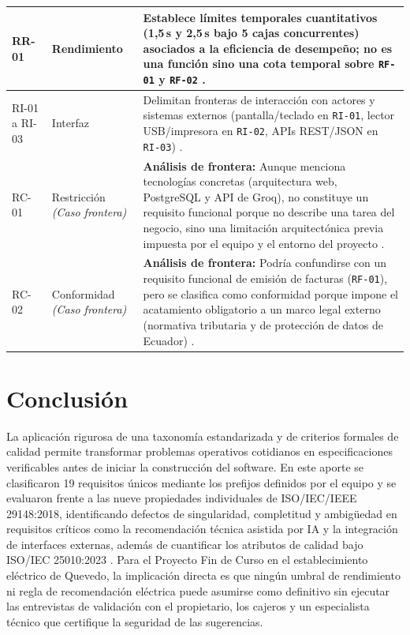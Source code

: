 \documentclass[onecolumn,12pt]{IEEEtran}
\begin{document}
\begin{longtable}{>{\raggedright\arraybackslash}p{1.4cm} >{\raggedright\arraybackslash}p{2.4cm} >{\raggedright\arraybackslash}p{11.2cm}}
		\midrule
		RR-01 & Rendimiento & Establece l\'imites temporales cuantitativos (1,5\,s y 2,5\,s bajo 5 cajas concurrentes) asociados a la eficiencia de desempe\~no; no es una funci\'on sino una cota temporal sobre \texttt{RF-01} y \texttt{RF-02} \cite{iso29148,iso25010}. \\
		\midrule
		RI-01 a RI-03 & Interfaz & Delimitan fronteras de interacci\'on con actores y sistemas externos (pantalla/teclado en \texttt{RI-01}, lector USB/impresora en \texttt{RI-02}, APIs REST/JSON en \texttt{RI-03}) \cite{iso29148}. \\
		\midrule
		RC-01 & Restricci\'on \textit{(Caso frontera)} & \textbf{An\'alisis de frontera:} Aunque menciona tecnolog\'ias concretas (arquitectura web, PostgreSQL y API de Groq), no constituye un requisito funcional porque no describe una tarea del negocio, sino una limitaci\'on arquitect\'onica previa impuesta por el equipo y el entorno del proyecto \cite{pohl2025,glinz2007}. \\
		\midrule
		RC-02 & Conformidad \textit{(Caso frontera)} & \textbf{An\'alisis de frontera:} Podr\'ia confundirse con un requisito funcional de emisi\'on de facturas (\texttt{RF-01}), pero se clasifica como conformidad porque impone el acatamiento obligatorio a un marco legal externo (normativa tributaria y de protecci\'on de datos de Ecuador) \cite{iso29148,swebok4}. \\
	\end{longtable}
	
	\section{Conclusi\'on}
	
	La aplicaci\'on rigurosa de una taxonom\'ia estandarizada y de criterios formales de calidad permite transformar problemas operativos cotidianos en especificaciones verificables antes de iniciar la construcci\'on del software. En este aporte se clasificaron 19 requisitos \'unicos mediante los prefijos definidos por el equipo y se evaluaron frente a las nueve propiedades individuales de ISO/IEC/IEEE 29148:2018, identificando defectos de singularidad, completitud y ambig\"uedad en requisitos cr\'iticos como la recomendaci\'on t\'ecnica asistida por IA y la integraci\'on de interfaces externas, adem\'as de cuantificar los atributos de calidad bajo ISO/IEC 25010:2023 \cite{iso29148,iso25010,pohl2025}. Para el Proyecto Fin de Curso en el establecimiento el\'ectrico de Quevedo, la implicaci\'on directa es que ning\'un umbral de rendimiento ni regla de recomendaci\'on el\'ectrica puede asumirse como definitivo sin ejecutar las entrevistas de validaci\'on con el propietario, los cajeros y un especialista t\'ecnico que certifique la seguridad de las sugerencias.
	
\end{document}
